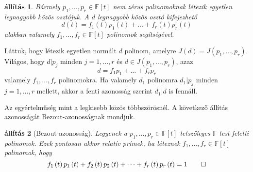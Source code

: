 \documentclass[9pt, a4paper, showtrims]{memoir}
\makeatletter
\renewenvironment{proof}[1][\proofname]
    {\par\pushQED{\qed}%
    \normalfont \topsep6\p@\@plus6\p@\relax
    \trivlist
    \item[\hskip\labelsep
        \itshape
    #1\@addpunct{:}]\ignorespaces}
    {\popQED\endtrivlist\@endpefalse}
\theoremstyle{plain}
\newtheorem{proposition}{állítás}[chapter]
\theoremstyle{remark}
\theoremstyle{definition}
\makeatother
\begin{document}
\begin{proposition}
    Bármely $p_1,\dots,p_r\in\mathbb{F}\left[ t \right]$ nem zérus polinomoknak
    létezik egyetlen legnagyobb közös osztójuk.
    A $d$ legnagyobb közös osztó kifejezhető
    \[
        d\left( t \right)=f_1\left( t \right)p_1\left( t \right)+
        \dots+
        f_r\left( t \right)p_r\left( t \right)
    \]
    alakban valamely $f_1,\dots,f_r\in\mathbb{F}\left[ t \right]$ polinomok segítségével.
\end{proposition}
\begin{proof}
    Láttuk, hogy létezik egyetlen normált $d$ polinom, amelyre $J\left( d \right)=J\left( p_1,\dots,p_r \right)$.
    Világos, hogy $d|p_j$ minden $j=1,\dots,r$ és $d\in J\left( p_1,\dots,p_r \right)$,
    azaz
    \[
        d=f_1p_1+\dots+f_rp_r
    \]
    valamely $f_1,\dots,f_r$ polinomokra.
    Ha valamely $d_1$ polinomra $d_1|p_j$ minden $j=1,\dots,r$ mellett,
    akkor a fenti azonosság szerint $d_1|d$ is fennáll.

    Az egyértelműség mint a legkisebb közös többszörösnél.
\end{proof}
A következő állítás azonosságát Bezout-azonosságnak mondjuk.
\begin{proposition}[Bezout-azonosság]
    Legyenek a $p_1,\dots,p_r\in\mathbb{F}\left[ t \right]$ tetszőleges $\mathbb{F}$ test feletti polinomok.
    Ezek pontosan akkor relatív prímek, 
    ha léteznek $f_1,\dots,f_r\in\mathbb{F}\left[ t \right]$ polinomok, hogy
    \[
        f_1\left( t \right)p_1\left( t \right)+f_2\left( t \right)p_2\left( t \right)+\dots+f_r\left( t \right)p_r\left( t \right)=1\qedhere
    \]
\end{proposition}
\end{document}
